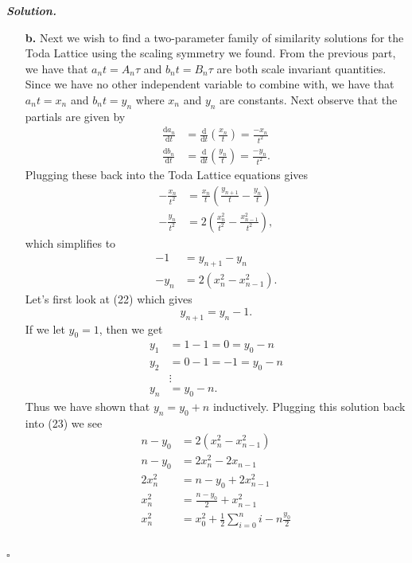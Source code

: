 \documentclass[12pt]{report}
\newenvironment{solution}[1][\it{Solution}]{\textbf{#1. } }{$\square$}
\def\half{\frac{1}{2}}
\newcommand{\paren}[1]{{\left(#1\right)}} %
\newcommand{\dd}[2]{\frac{\mathrm{d} #1}{\mathrm{d} #2}} %
\begin{document}
\begin{solution}
\begin{enumerate}
        \item [{\bf b.}]
        Next we wish to find a two-parameter family of similarity solutions for the Toda Lattice using the scaling symmetry we found. From the previous part, we have that $a_n t = A_n \tau$ and $b_n t = B_n \tau$ are both scale invariant quantities. Since we have no other independent variable to combine with, we have that $a_n t = x_n$ and $b_n t = y_n$ where $x_n$ and $y_n$ are constants. Next observe that the partials are given by
        \begin{align*}
            \dd{a_n}{t} &= \dd{}{t}\paren{\frac{x_n}{t}} = \frac{-x_n}{t^2}\\
            \dd{b_n}{t} &= \dd{}{t}\paren{\frac{y_n}{t}} = \frac{-y_n}{t^2}.
        \end{align*}
        Plugging these back into the Toda Lattice equations gives
        \begin{align*}
            -\frac{x_n}{t^2} &= \frac{x_n}{t}\paren{\frac{y_{n+1}}{t} - \frac{y_n}{t}}\\
            -\frac{y_n}{t^2} &= 2\paren{\frac{x_n^2}{t^2} - \frac{x_{n-1}^2}{t^2}},
        \end{align*}
        which simplifies to
        \begin{align}
            -1 &= y_{n+1} - y_n\\
            -y_n &= 2(x_n^2 - x_{n-1}^2).
        \end{align}
        Let's first look at (22) which gives
        \[ 
            y_{n+1} = y_n - 1.
        \]
        If we let $y_0 = 1$, then we get
        \begin{align*}
            y_1 &= 1 - 1 = 0 = y_0 - n\\
            y_2 &= 0 - 1 = -1 = y_0 - n\\
            &\vdots\\
            y_n &= y_0 - n.
        \end{align*}
        Thus we have shown that $y_n = y_0 + n$ inductively. Plugging this solution back into (23) we see
        \begin{align*}
            n - y_0 &= 2(x_n^2 - x_{n-1}^2)\\
            n - y_0 &= 2x_n^2 - 2x_{n-1}\\
            2x_n^2 &= n - y_0 + 2x_{n-1}^2\\
            x_n^2 &= \frac{n - y_0}{2} + x_{n-1}^2\\
            x_n^2 &= x_0^2 + \half \sum_{i = 0}^n i - n\frac{y_0}{2}\\

\end{align*}
\end{enumerate}
\end{solution}
\end{document}

